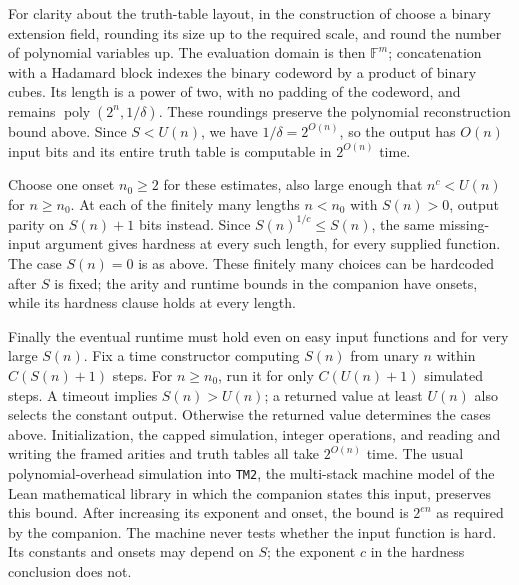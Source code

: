 \documentclass[11pt,letterpaper]{article}
\theoremstyle{definition}
\theoremstyle{remark}
\newcommand{\poly}{\operatorname{poly}}
\begin{document}
For clarity about the truth-table layout, in the construction of
\cite[Lemmas~25 and~28]{STV01} choose a binary extension field,
rounding its size up to the required scale, and round the number
of polynomial variables up. The evaluation domain is then
\(\mathbb F^m\); concatenation with a Hadamard block indexes the
binary codeword by a product of binary cubes. Its length is a
power of two, with no padding of the codeword, and remains
\(\poly(2^n,1/\delta)\). These roundings preserve the polynomial
reconstruction bound above. Since \(S<U(n)\), we have
\(1/\delta=2^{O(n)}\), so the output has \(O(n)\) input bits and
its entire truth table is computable in \(2^{O(n)}\) time.

Choose one onset \(n_0\ge2\) for these estimates, also large enough
that \(n^c<U(n)\) for \(n\ge n_0\). At each of the finitely many
lengths \(n<n_0\) with \(S(n)>0\), output parity on \(S(n)+1\)
bits instead. Since \(S(n)^{1/c}\le S(n)\), the same missing-input
argument gives hardness at every such length, for every supplied
function. The case \(S(n)=0\) is as above. These finitely many
choices can be hardcoded after \(S\) is fixed; the arity and
runtime bounds in the companion have onsets, while its hardness
clause holds at every length.

Finally the eventual runtime must hold even on easy input
functions and for very large \(S(n)\). Fix a time constructor
computing \(S(n)\) from unary \(n\) within \(C(S(n)+1)\) steps.
For \(n\ge n_0\), run it for only \(C(U(n)+1)\) simulated steps.
A timeout implies \(S(n)>U(n)\); a returned value at least \(U(n)\)
also selects the constant output. Otherwise the returned value
determines the cases above. Initialization, the capped simulation,
integer operations, and reading and writing the framed arities
and truth tables all take \(2^{O(n)}\) time. The usual
polynomial-overhead simulation into \texttt{TM2}, the multi-stack
machine model of the Lean mathematical library in which the companion
states this input, preserves this bound.
After increasing its exponent and onset, the bound is
\(2^{en}\) as required by the companion. The machine never tests
whether the input function is hard. Its constants and onsets may
depend on \(S\); the exponent \(c\) in the hardness conclusion
does not.
\end{document}
